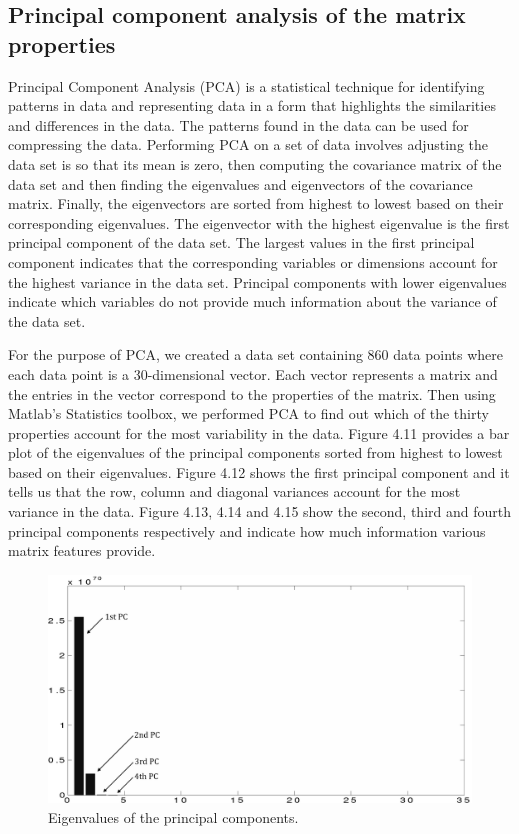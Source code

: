 \subsection{Principal component analysis of the matrix properties}
Principal Component Analysis (PCA) \cite{smith} is a statistical technique for identifying patterns in data and representing data in a form that highlights the similarities and differences in the data. The patterns found in the data can be used for compressing the data. Performing PCA on a set of data involves adjusting the data set is so that its mean is zero, then computing the covariance matrix of the data set and then finding the eigenvalues and eigenvectors of the covariance matrix. Finally, the eigenvectors are sorted from highest to lowest based on their corresponding eigenvalues. The eigenvector with the highest eigenvalue is the first principal component of the data set. The largest values in the first principal component indicates that the corresponding variables or dimensions account for the highest variance in the data set. Principal components with lower eigenvalues indicate which variables do not provide much information about the variance of the data set.

For the purpose of PCA, we created a data set containing 860 data points where each data point is a 30-dimensional vector. Each vector represents a matrix and the entries in the vector correspond to the properties of the matrix. Then using Matlab's Statistics toolbox, we performed PCA to find out which of the thirty properties account for the most variability in the data. Figure 4.11 provides a bar plot of the eigenvalues of the principal components sorted from highest to lowest based on their eigenvalues. Figure 4.12 shows the first principal component and it tells us that the row, column and diagonal variances account for the most variance in the data. Figure 4.13, 4.14 and 4.15 show the second, third and fourth principal components respectively and indicate how much information various matrix features provide.

\begin{figure}[H]\label{eigenvalues}
  \centering
  \includegraphics[width=6in]{figs/eigenvalues}
  \caption[Eigenvalues of the principal components.]
   {Eigenvalues of the principal components.}
\end{figure}


